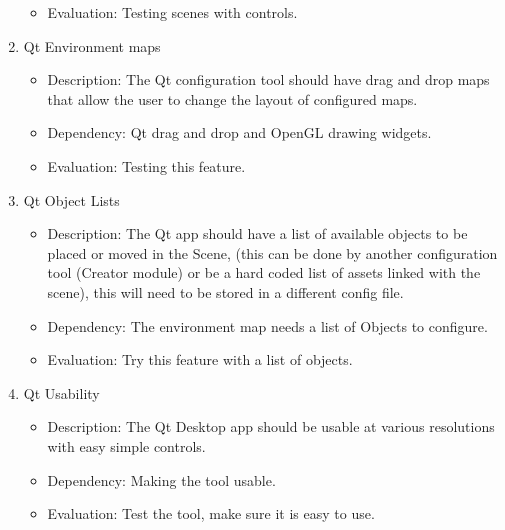 \documentclass[a4paper,10pt,twoside]{article}
\begin{document}
\begin{enumerate}
\begin{itemize}
		\item Evaluation:  Testing scenes with controls.
		\end{itemize}
		\item Qt Environment maps
		\begin{itemize}
		\item Description: The Qt configuration tool should have drag and drop maps that allow the user to change the layout of configured maps.
		\item Dependency:  Qt drag and drop and OpenGL drawing widgets. 
		\item Evaluation:  Testing this feature.
		\end{itemize}
		\item Qt Object Lists
		\begin{itemize}
		\item Description: The Qt app should have a list of available objects to be placed or moved in the Scene, (this can be done by another configuration tool 
		(Creator module) or be a hard coded list of assets linked with the scene), this will need to be stored in a different config file. 
		\item Dependency:  The environment map needs a list of Objects to configure. 
		\item Evaluation:  Try this feature with a list of objects.
		\end{itemize}

		\item Qt Usability
		\begin{itemize}
		\item Description: The Qt Desktop app should be usable at various resolutions with easy simple controls. 
		\item Dependency:  Making the tool usable.
		\item Evaluation:  Test the tool, make sure it is easy to use.
		\end{itemize}
		

\end{enumerate}
\end{document}
